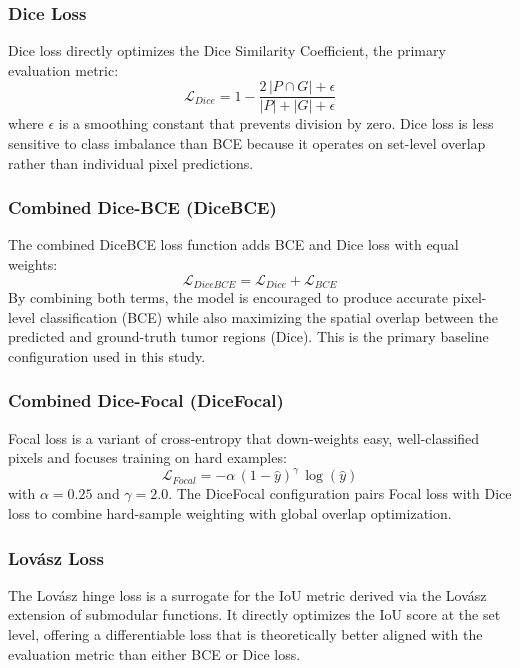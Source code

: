 \documentclass[a4paper,12pt]{article}
\begin{document}
\subsubsection{Dice Loss}
Dice loss directly optimizes the Dice Similarity Coefficient, the primary evaluation metric:
\begin{equation}
    \mathcal{L}_{Dice} = 1 - \frac{2\,|P \cap G| + \epsilon}{|P| + |G| + \epsilon}
\end{equation}
where $\epsilon$ is a smoothing constant that prevents division by zero. Dice loss is less
sensitive to class imbalance than BCE because it operates on set-level overlap rather than
individual pixel predictions.

\subsubsection{Combined Dice-BCE (DiceBCE)}
The combined DiceBCE loss function adds BCE and Dice loss with equal weights:
\begin{equation}
    \mathcal{L}_{DiceBCE} = \mathcal{L}_{Dice} + \mathcal{L}_{BCE}
\end{equation}
By combining both terms, the model is encouraged to produce accurate pixel-level classification
(BCE) while also maximizing the spatial overlap between the predicted and ground-truth tumor
regions (Dice). This is the primary baseline configuration used in this study.

\subsubsection{Combined Dice-Focal (DiceFocal)}
Focal loss \cite{lin2017focal} is a variant of cross-entropy that down-weights easy, well-classified
pixels and focuses training on hard examples:
\begin{equation}
    \mathcal{L}_{Focal} = -\alpha\,{(1 - \hat{y})}^{\gamma}\,\log(\hat{y})
\end{equation}
with $\alpha = 0.25$ and $\gamma = 2.0$. The DiceFocal configuration pairs Focal loss with Dice
loss to combine hard-sample weighting with global overlap optimization.

\subsubsection{Lovász Loss}
The Lovász hinge loss \cite{berman2018lovasz} is a surrogate for the IoU metric derived via the
Lovász extension of submodular functions. It directly optimizes the IoU score at the set level,
offering a differentiable loss that is theoretically better aligned with the evaluation metric
than either BCE or Dice loss.
\end{document}
